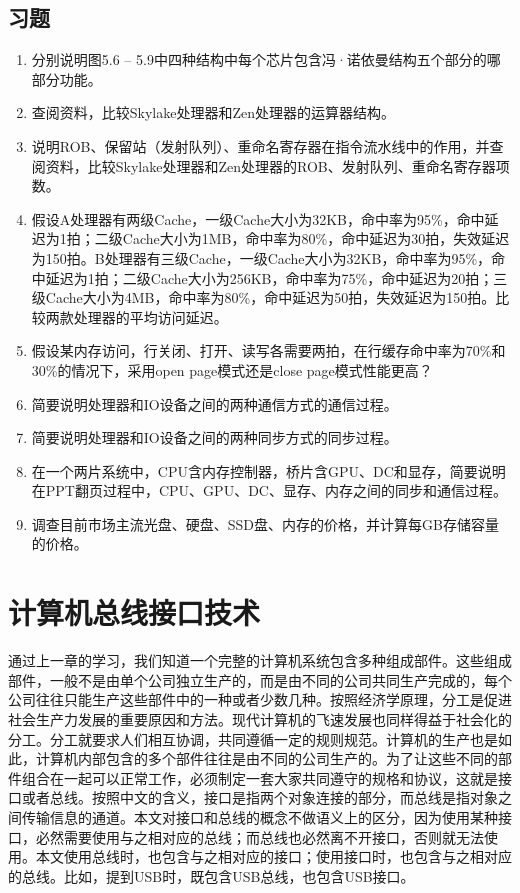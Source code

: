 \documentclass[]{ctexbook}
\begin{document}
\hypertarget{ux4e60ux9898-4}{%
\section{习题}\label{ux4e60ux9898-4}}

\begin{enumerate}
\def\labelenumi{\arabic{enumi}.}
\item
  分别说明图5.6 -- 5.9中四种结构中每个芯片包含冯·诺依曼结构五个部分的哪部分功能。
\item
  查阅资料，比较Skylake处理器和Zen处理器的运算器结构。
\item
  说明ROB、保留站（发射队列）、重命名寄存器在指令流水线中的作用，并查阅资料，比较Skylake处理器和Zen处理器的ROB、发射队列、重命名寄存器项数。
\item
  假设A处理器有两级Cache，一级Cache大小为32KB，命中率为95\%，命中延迟为1拍；二级Cache大小为1MB，命中率为80\%，命中延迟为30拍，失效延迟为150拍。B处理器有三级Cache，一级Cache大小为32KB，命中率为95\%，命中延迟为1拍；二级Cache大小为256KB，命中率为75\%，命中延迟为20拍；三级Cache大小为4MB，命中率为80\%，命中延迟为50拍，失效延迟为150拍。比较两款处理器的平均访问延迟。
\item
  假设某内存访问，行关闭、打开、读写各需要两拍，在行缓存命中率为70\%和30\%的情况下，采用open page模式还是close page模式性能更高？
\item
  简要说明处理器和IO设备之间的两种通信方式的通信过程。
\item
  简要说明处理器和IO设备之间的两种同步方式的同步过程。
\item
  在一个两片系统中，CPU含内存控制器，桥片含GPU、DC和显存，简要说明在PPT翻页过程中，CPU、GPU、DC、显存、内存之间的同步和通信过程。
\item
  调查目前市场主流光盘、硬盘、SSD盘、内存的价格，并计算每GB存储容量的价格。
\end{enumerate}

\newpage

\hypertarget{ux8ba1ux7b97ux673aux603bux7ebfux63a5ux53e3ux6280ux672f}{%
\chapter{计算机总线接口技术}\label{ux8ba1ux7b97ux673aux603bux7ebfux63a5ux53e3ux6280ux672f}}

通过上一章的学习，我们知道一个完整的计算机系统包含多种组成部件。这些组成部件，一般不是由单个公司独立生产的，而是由不同的公司共同生产完成的，每个公司往往只能生产这些部件中的一种或者少数几种。按照经济学原理，分工是促进社会生产力发展的重要原因和方法。现代计算机的飞速发展也同样得益于社会化的分工。分工就要求人们相互协调，共同遵循一定的规则规范。计算机的生产也是如此，计算机内部包含的多个部件往往是由不同的公司生产的。为了让这些不同的部件组合在一起可以正常工作，必须制定一套大家共同遵守的规格和协议，这就是接口或者总线。按照中文的含义，接口是指两个对象连接的部分，而总线是指对象之间传输信息的通道。本文对接口和总线的概念不做语义上的区分，因为使用某种接口，必然需要使用与之相对应的总线；而总线也必然离不开接口，否则就无法使用。本文使用总线时，也包含与之相对应的接口；使用接口时，也包含与之相对应的总线。比如，提到USB时，既包含USB总线，也包含USB接口。
\end{document}
